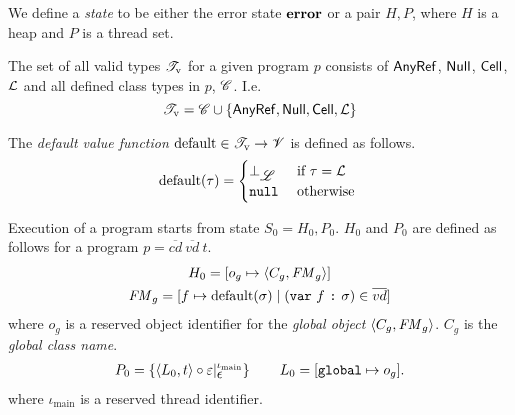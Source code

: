 \begin{definition}
  We define a \emph{state} to be either the error state $\mbox{{\bf error}}$ or a pair $H,
  P$, where $H$ is a heap and $P$ is a thread set.
\end{definition}

\begin{definition}
  The set of all valid types $\mathscr{T}_{\text{v}}$ for a given program $p$ consists of
  $\mbox{$\mathsf{AnyRef}$}$, $\mbox{$\mathsf{Null}$}$, $\mbox{$\mathsf{Cell}$}$, $\mbox{$\mathcal{L}$}$ and all defined
  class types in $p$, $\mathscr{C}$. I.e.
  \begin{equation*}
    \mathscr{T}_{\text{v}} = \mathscr{C} \cup \left\{ \mbox{$\mathsf{AnyRef}$}, \mbox{$\mathsf{Null}$}, \mbox{$\mathsf{Cell}$},
    \mbox{$\mathcal{L}$} \right\}
  \end{equation*}
\end{definition}

\begin{definition}
  The \emph{default value function} $\mbox{$\mathrm{default}$} \in \mathscr{T}_{\text{v}} \to \mathscr{V}$ is
  defined as follows.
  \begin{equation*}
    \mbox{$\mathrm{default}$}(\tau) =
    \begin{cases}
      \bot_{\mbox{$\mathscr{L}$}} & \text{ if } \tau = \mbox{$\mathcal{L}$} \\
      \mbox{\mdseries\texttt{null}}        & \text{ otherwise } 
    \end{cases}
  \end{equation*}
\end{definition}

\begin{definition} \label{def:state_zero}
  Execution of a program starts from state $S_0 = H_0, P_0$. $H_0$ and
  $P_0$ are defined as follows for a program $p =
  \overline{cd}~\overline{vd}~t$.
  \begin{equation*}
    \begin{gathered}
      H_0 = [o_g \mapsto \mbox{$\langle C_g, \mathit{FM}_g \rangle$}] \\
      \mathit{FM}_g = [f \mapsto \mbox{$\mathrm{default}$}(\sigma) \mid (\mbox{\mdseries\texttt{var}~$f$~\texttt{:}~$\sigma$}) \in \overline{vd}]
    \end{gathered}
  \end{equation*}
  where $o_g$ is a reserved object identifier for the \emph{global object} $\mbox{$\langle C_g,
  \mathit{FM}_g \rangle$}$. $C_g$ is the \emph{global class name}.  
  \begin{equation*}
    \begin{gathered}
      P_0 = \left\{ \mbox{$\langle L_0, t \rangle$} \circ \varepsilon
      |_{\mbox{$\epsilon$}}^{\iota_{\text{main}}} \right\} \quad\quad
      L_0 = [ \mbox{\mdseries\texttt{global}} \mapsto o_g ].
    \end{gathered}
  \end{equation*}
  where $\iota_{\text{main}}$ is a reserved thread identifier.
\end{definition}

